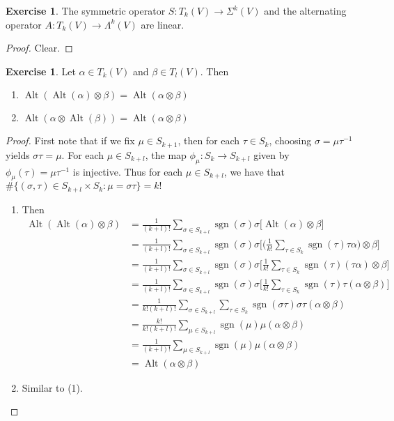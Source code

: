 \documentclass{book}
\theoremstyle{definition}
\newtheorem{ex}[definition]{Exercise}
\newcommand{\al}{\alpha}
\newcommand{\be}{\beta}
\newcommand{\sig}{\sigma}
\newcommand{\Lam}{\Lambda}
\newcommand{\Sig}{\Sigma}
\DeclareMathOperator{\sgn}{sgn}
\DeclareMathOperator{\Alt}{Alt}
\DeclareMathOperator*{\0}{\mbf{0}}
\DeclareMathOperator*{\1}{\mbf{1}}
\begin{document}
	\begin{ex}
		The symmetric operator $S: T_k(V) \rightarrow \Sig^k(V)$ and the alternating operator $A: T_k(V) \rightarrow \Lam^k(V)$ are linear.
	\end{ex}

	\begin{proof}
		Clear.
	\end{proof}

	\begin{ex}
		Let $\al \in T_k(V)$ and $\be \in T_l(V)$. Then 
		\begin{enumerate}
			\item $\Alt(\Alt(\al) \otimes \be) = \Alt(\al \otimes \be)$
			\item $\Alt(\al \otimes \Alt(\be)) = \Alt(\al \otimes \be)$
		\end{enumerate}
	\end{ex}
	
	\begin{proof}
		First note that if we fix $\mu \in S_{k+1}$, then for each $\tau \in S_k$, choosing $\sig = \mu \tau^{-1}$ yields $\sig \tau = \mu$. For each $\mu \in S_{k+l}$, the map $\phi_{\mu}: S_{k} \rightarrow S_{k+l}$ given by $\phi_{\mu}(\tau) = \mu \tau^{-1}$ is injective. Thus for each $\mu \in S_{k+l}$, we have that $\# \{ (\sig, \tau) \in S_{k+l} \times S_{k}: \mu = \sig \tau \} = k!$ 
		\begin{enumerate}
			\item Then
			\begin{align*}
				\Alt(\Alt(\al) \otimes \be)
				&= \frac{1}{(k+l)!} \sum_{\sig \in S_{k+l}} \sgn(\sig) \sig \bigg [\Alt(\al) \otimes \be \bigg] \\
				&= \frac{1}{(k+l)!} \sum_{\sig \in S_{k+l}} \sgn(\sig) \sig \bigg[ \bigg( \frac{1}{k!}\sum_{\tau \in S_{k} } \sgn(\tau) \tau\al \bigg) \otimes \be \bigg] \\
				&= \frac{1}{(k+l)!} \sum_{\sig \in S_{k+l}} \sgn(\sig) \sig \bigg[   \frac{1}{k!} \sum_{\tau \in S_{k} } \sgn(\tau) (\tau\al)  \otimes \be \bigg] \\
				&= \frac{1}{(k+l)!} \sum_{\sig \in S_{k+l}} \sgn(\sig) \sig \bigg[  \frac{1}{k!} \sum_{\tau \in S_{k} } \sgn(\tau) \tau (\al  \otimes \be) \bigg] \\
				&=  \frac{1}{k! (k+l)!}\sum_{\sig \in S_{k+l} } \sum_{\tau \in S_{k} } \sgn(\sig \tau) \sig \tau (\al  \otimes \be) \\
				&=  \frac{k!}{k!(k+l)!} \sum_{\mu \in S_{k+l} }  \sgn(\mu) \mu (\al  \otimes \be)\\
				&=  \frac{1}{(k+l)!} \sum_{\mu \in S_{k+l} }  \sgn(\mu) \mu (\al  \otimes \be)\\
				&= \Alt(\al \otimes \be)
			\end{align*} 
			\item Similar to (1).
		\end{enumerate}
	\end{proof}
	
\end{document}
